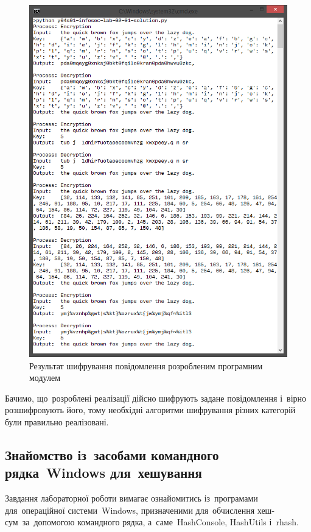 \documentclass[
	a4paper,
	oneside,
	BCOR = 10mm,
	DIV = 12,
	12pt,
	headings = normal,
]{scrartcl}
\begin{document}
			\begin{figure}[!htbp]
				\centering
				\includegraphics[height = 16\baselineskip]{./assets/00.png}
				\caption{Результат шифрування повідомлення розробленим програмним модулем}
				\label{fig:script-encryption-res}
			\end{figure}

			Бачимо, що~розроблені реалізації дійсно шифрують задане повідомлення і~вірно розшифровують його, тому необхідні алгоритми шифрування різних категорій були правильно реалізовані.

		\subsection{Знайомство із~засобами командного рядка~\textenglish{Windows} для~хешування}
			Завдання лабораторної роботи вимагає ознайомитись із~програмами для~операційної системи~\textenglish{Windows}, призначеними для~обчислення хеш-сум~за~допомогою командного рядка, а~саме~\textenglish{HashConsole}, \textenglish{HashUtils} і~\textenglish{rhash}.
\end{document}

